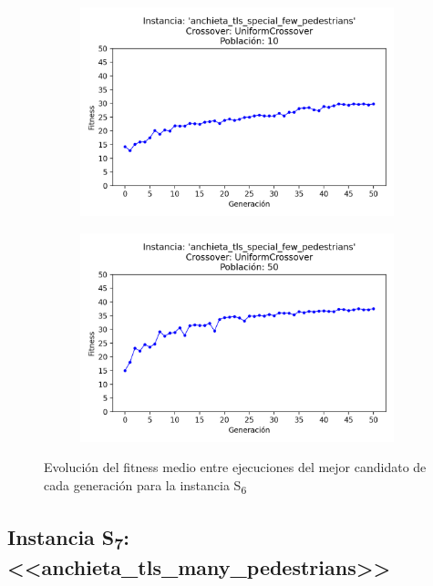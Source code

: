 \begin{figure}[h]
\begin{subfigure}[t]{.49\textwidth}
      \includegraphics[width=\textwidth]{report/images/estudio/anchieta_tls_special_few_pedestrians-UniformCrossover-10.png}
    \end{subfigure}
    \hfill
    \begin{subfigure}[t]{.49\textwidth}
      \centering
      \includegraphics[width=\textwidth]{report/images/estudio/anchieta_tls_special_few_pedestrians-UniformCrossover-50.png}
    \end{subfigure}
    \caption{Evolución del fitness medio entre ejecuciones del mejor candidato de cada generación para la instancia S\textsubscript{6}}
    \label{fig:estudio:anchieta_tls_special_few_pedestrians}
\end{figure}



\subsection{Instancia S\textsubscript{7}: <<anchieta\_tls\_many\_pedestrians>>}

